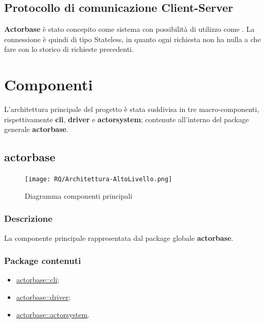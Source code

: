 \documentclass{scalatekids-article}
\begin{document}
\subsection{Protocollo di comunicazione Client-Server}
\label{sec:HTTP}

\textbf{Actorbase} è stato concepito come sistema  con
possibilità di utilizzo come . La connessione è quindi di
tipo Stateless, in quanto ogni richiesta non ha nulla a che fare con lo storico
di richieste precedenti.

\section{Componenti}

L'architettura principale del progetto è stata suddivisa in tre macro-componenti, rispettivamente
\textbf{cli}, \textbf{driver} e \textbf{actorsystem}; contenute all'interno del package
generale \textbf{actorbase}.

\subsection{actorbase}
\label{sec:actorbase}

\begin{figure}[H]
  \begin{center}
    \texttt{[image: RQ/Architettura-AltoLivello.png]}
    \caption{Diagramma componenti principali}
  \end{center}
\end{figure}

\subsubsection{Descrizione}

La componente principale rappresentata dal package globale \textbf{actorbase}.

\subsubsection{Package contenuti}

\begin{itemize}
\item \hyperref[sec:actorbase::cli]{actorbase::cli};
\item \hyperref[sec:actorbase::driver]{actorbase::driver};
\item \hyperref[sec:actorbase::actorsystem]{actorbase::actorsystem}.
\end{itemize}
\end{document}
